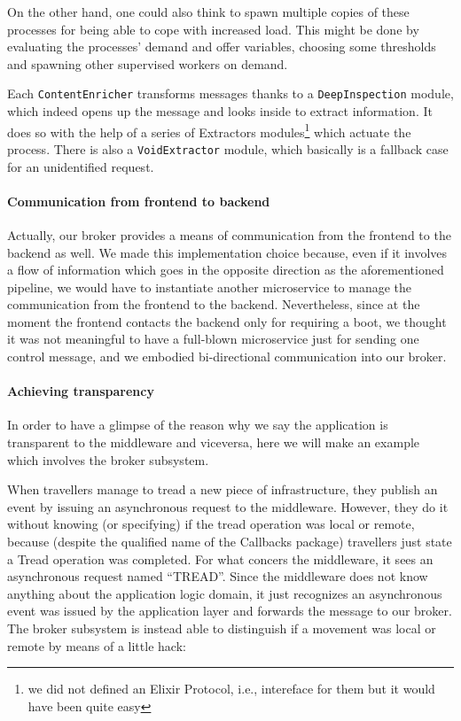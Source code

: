 On the other hand, one could also think to spawn multiple copies of these
processes for being able to cope with increased load.
This might be done by evaluating the processes' demand and offer variables,
choosing some thresholds and spawning other supervised workers on demand.

Each \texttt{ContentEnricher} transforms messages thanks to a
\texttt{DeepInspection} module, which indeed opens up the message and looks
inside to extract information.
It does so with the help of a series of Extractors modules\footnote{we did not
defined an Elixir Protocol, i.e., intereface for them but it would have been
quite easy} which actuate the process. There is also a \texttt{VoidExtractor}
module, which basically is a fallback case for an unidentified request.

\paragraph{Communication from frontend to backend}
Actually, our broker provides a means of communication from the frontend to
the backend as well.
We made this implementation choice because, even if it involves a flow of
information which goes in the opposite direction as the aforementioned
pipeline, we would have to instantiate another microservice to manage the
communication from the frontend to the backend.
Nevertheless, since at the moment the frontend contacts the backend only for
requiring a boot, we thought it was not meaningful to have a full-blown
microservice just for sending one control message, and we embodied
bi-directional communication into our broker.

\paragraph{Achieving transparency}
In order to have a glimpse of the reason why we say the application is
transparent to the middleware and viceversa, here we will make an example which
involves the broker subsystem.

When travellers manage to tread a new piece of infrastructure, they publish an
event by issuing an asynchronous request to the middleware. However, they do it
without knowing (or specifying) if the tread operation was local or remote,
because (despite the qualified name of the Callbacks package) travellers just
state a Tread operation was completed.
For what concers the middleware, it sees an asynchronous request named
``TREAD''. Since the middleware does not know anything about the application
logic domain, it just recognizes an asynchronous event was issued by the
application layer and forwards the message to our broker.
The broker subsystem is instead able to distinguish if a movement was local or
remote by means of a little hack:


